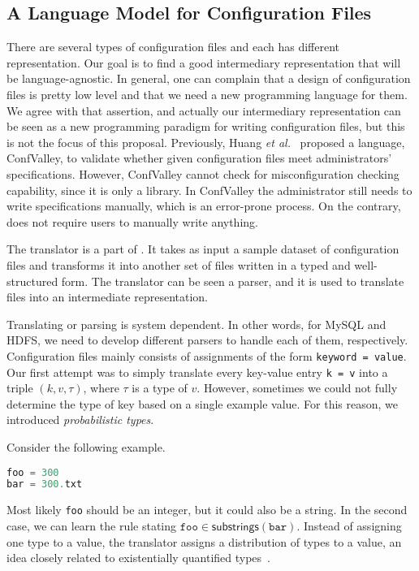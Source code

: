 \subsection{A Language Model for Configuration Files}
\label{sec:lang}

There are several types of configuration 
files and each has different representation. Our goal is to find a good 
intermediary representation that will be language-agnostic. In general,
one can complain that a design of configuration files is pretty low 
level and that we need a new programming language for them. We agree with 
that assertion, and actually our intermediary representation can be seen
as a new programming paradigm for writing configuration files, but this
is not the focus of this proposal. Previously, Huang {\em et al.}~\cite{huang15confvalley} proposed a 
language, ConfValley, to validate 
whether given configuration files meet administrators' specifications. 
However, ConfValley cannot check for misconfiguration checking 
capability, since it is only a library. In ConfValley the administrator 
still needs to write specifications manually, which is an error-prone
process. On the contrary, \app does not require users to manually
write anything.

The translator is a part of \app. It takes as input a sample dataset of configuration files and transforms it into another set of files written in a
typed and well-structured form.
The translator can be seen a parser, and it is
used to translate files into an intermediate representation.

Translating or parsing is system dependent. In other words, for MySQL
and HDFS, we need to develop different parsers to handle each of them,
respectively. Configuration files mainly consists of assignments of the form {\tt {keyword = value}}. Our first attempt was to simply
translate every key-value entry {\tt {k = v}} into a triple $(k, v, \tau)$, where $\tau$ is a type of 
$v$. However, sometimes we could not fully determine the type of key 
based on a single example value. For this reason, we introduced {\emph {probabilistic types}}.

Consider the following example.
\begin{lstlisting}[language=C, xleftmargin=.01\textwidth]
foo = 300
bar = 300.txt
\end{lstlisting} 
Most likely {\tt foo} should be an integer, but it could also be a string.
In the second case, we can learn the rule stating 
$ \texttt{foo} \in \textsf{substrings}(\texttt{bar})$. 
Instead of assigning one type to a value, the translator assigns a distribution of types 
to a value, an idea closely related to existentially quantified 
types~\cite{Launchbury93lazyfunctional}. 

